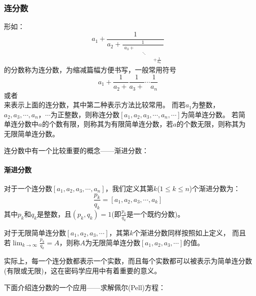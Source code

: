 \documentclass{article}
\numberwithin{equation}{subsubsection}
\begin{document}
\subsubsection{连分数}
形如：
\begin{equation}
    a_1+\frac{1}{a_2+\frac{1}{\begin{matrix}a_3+\\&&\ddots\\&&&&+\frac{1}{a_n}\end{matrix}}}
    \nonumber
\end{equation}
的分数称为连分数，为缩减篇幅方便书写，一般常用符号
\begin{equation}
    a_1+\frac{1}{a_2+}\frac{1}{a_3+}\cdots\frac{1}{a_n}
    \nonumber
\end{equation}
或者
\begin{equation}
    [a_1,a_2,a_3,\cdots,a_n]
    \nonumber
\end{equation}
来表示上面的连分数，其中第二种表示方法比较常用。
而若$a_1$为整数，$a_2,a_3,\cdots,a_n，\cdots$为正整数，则称连分数$[a_1,a_2,a_3,\cdots,a_n,\cdots]$为简单连分数。
若简单连分数中$a$的个数有限，则称其为有限简单连分数，若$a$的个数无限，则称其为无限简单连分数。\par
连分数中有一个比较重要的概念——渐进分数：
\paragraph{\textbf{渐进分数}}
对于一个连分数$[a_1,a_2,a_3,\cdots,a_n]$，我们定义其第$k$($1\le k\le n$)个渐进分数为：
\begin{equation}
    \frac{p_k}{q_k}=[a_1,a_2,a_3,\cdots,a_k]
    \nonumber
\end{equation}
其中$p_k$和$q_k$是整数，且$(p_k,q_k)=1$(即$\frac{p_k}{q_k}$是一个既约分数)。\par
对于无限简单连分数$[a_1,a_2,a_3,\cdots]$，其第$k$个渐进分数同样按照如上定义，
而且若$\lim_{k\to\infty}\frac{p_k}{q_k}=A$，则称$A$为无限简单连分数$[a_1,a_2,a_3,\cdots]$的值。\par
实际上，每一个连分数都表示一个实数，而且每个实数都可以被表示为简单连分数(有限或无限)，这在密码学应用中有着重要的意义。\par
下面介绍连分数的一个应用——求解佩尔(Pell)方程：\par
\end{document}

